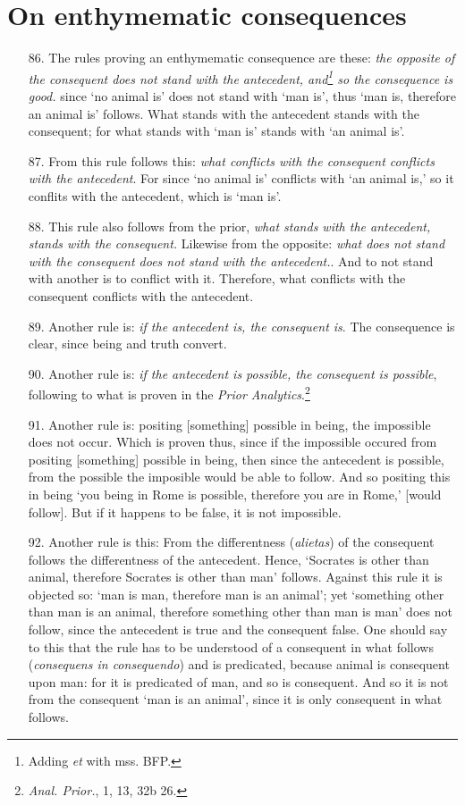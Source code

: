 \documentclass[]{article}
\begin{document}
\section{On enthymematic consequences}
\begin{itemize}
\item[86.] The rules proving an enthymematic consequence are these: \textit{the opposite of the consequent does not stand with the antecedent, and\footnote{Adding \textit{et} with mss. BFP.} so the consequence is good.} since `no animal is' does not stand with `man is', thus `man is, therefore an animal is' follows. What stands with the antecedent stands with the consequent; for what stands with `man is' stands with `an animal is'.
\item[87.] From this rule follows this: \textit{what conflicts with the consequent conflicts with the antecedent}. For since `no animal is' conflicts with `an animal is,' so it conflits with the antecedent, which is `man is'.
\item[88.] This rule also follows from the prior, \textit{what stands with the antecedent, stands with the consequent.} Likewise from the opposite: \textit{what does not stand with the consequent does not stand with the antecedent.}. And to not stand with another is to conflict with it. Therefore, what conflicts with the consequent conflicts with the antecedent.
\item[89.] Another rule is: \textit{if the antecedent is, the consequent is}. The consequence is clear, since being and truth convert.
\item[90.] Another rule is: \textit{if the antecedent is possible, the consequent is possible}, following to what is proven in the \textit{Prior Analytics}.\footnote{\textit{Anal. Prior.}, 1, 13, 32b 26.}
\item[91.] Another rule is: positing [something] possible in being, the impossible does not occur. Which is proven thus, since if the impossible occured from positing [something] possible in being, then since the antecedent is possible, from the possible the imposible would be able to follow. And so positing this in being `you being in Rome is possible, therefore you are in Rome,' [would follow]. But if it happens to be false, it is not impossible.
\item[92.] Another rule is this: From the differentness (\textit{alietas}) of the consequent follows the differentness of the antecedent. Hence, `Socrates is other than animal, therefore Socrates is other than man' follows. Against this rule it is objected so: `man is man, therefore man is an animal'; yet `something other than man is an animal, therefore something other than man is man' does not follow, since the antecedent is true and the consequent false. One should say to this that the rule has to be understood of a consequent in what follows (\textit{consequens in consequendo}) and is predicated, because animal is consequent upon man: for it is predicated of man, and so is consequent. And so it is not from the consequent `man is an animal', since it is only consequent in what follows.

\end{itemize}
\end{document}
